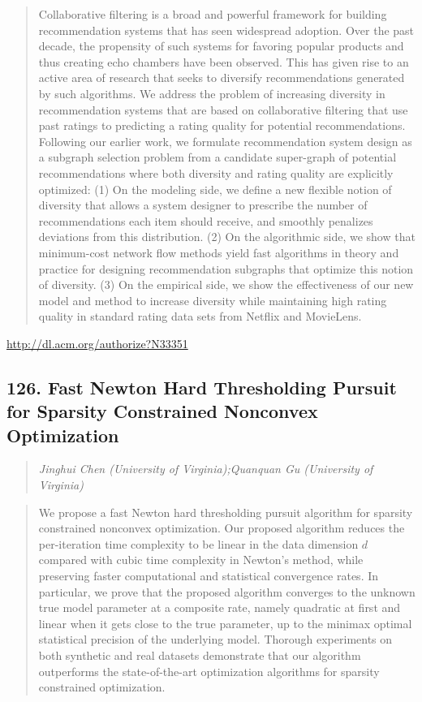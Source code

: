 \documentclass{article}
\begin{document}
\begin{quote}
Collaborative filtering is a broad and powerful framework for building recommendation systems that has seen widespread adoption. Over the past decade, the propensity of such systems for favoring popular products and thus creating echo chambers have been observed. This has given rise to an active area of research that seeks to diversify recommendations generated by such algorithms. We address the problem of increasing diversity in recommendation systems that are based on collaborative filtering that use past ratings to predicting a rating quality for potential recommendations. Following our earlier work, we formulate recommendation system design as a subgraph selection problem from a candidate super-graph of potential recommendations where both diversity and rating quality are explicitly optimized: (1) On the modeling side, we define a new flexible notion of diversity that allows a system designer to prescribe the number of recommendations each item should receive, and smoothly penalizes deviations from this distribution. (2) On the algorithmic side, we show that minimum-cost network flow methods yield fast algorithms in theory and practice for designing recommendation subgraphs that optimize this notion of diversity. (3) On the empirical side, we show the effectiveness of our new model and method to increase diversity while maintaining high rating quality in standard rating data sets from Netflix and MovieLens.
\end{quote}

\href{http://dl.acm.org/authorize?N33351}{http://dl.acm.org/authorize?N33351}

\subsection{126. Fast Newton Hard Thresholding Pursuit for Sparsity Constrained Nonconvex Optimization}

\begin{quote}
\footnotesize{\textit{Jinghui Chen (University of Virginia);Quanquan Gu (University of Virginia)}}

\end{quote}

\begin{quote}
We propose a fast Newton hard thresholding pursuit algorithm for sparsity constrained nonconvex optimization. Our proposed algorithm reduces the per-iteration time complexity to be linear in the data dimension $d$ compared with cubic time complexity in Newton’s method, while preserving faster computational and statistical convergence rates. In particular, we prove that the proposed algorithm converges to the unknown true model parameter at a composite rate, namely quadratic at first and linear when it gets close to the true parameter, up to the minimax optimal statistical precision of the underlying model. Thorough experiments on both synthetic and real datasets demonstrate that our algorithm outperforms the state-of-the-art optimization algorithms for sparsity constrained optimization.
\end{quote}
\end{document}
